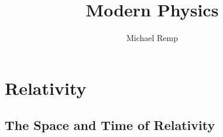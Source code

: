\documentclass{article}
\title{Modern Physics}
\author{Michael Remp}
\date{}
\begin{document}
\maketitle

    \section{Relativity}
        \subsection{The Space and Time of Relativity}
\end{document}
